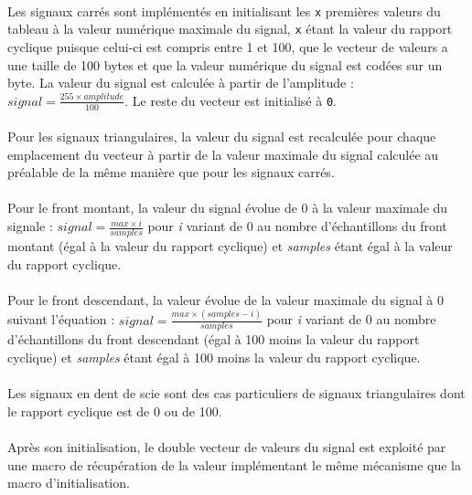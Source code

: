 \documentclass{article}
\begin{document}
    \paragraph{}
    Les signaux carrés sont implémentés en initialisant les \texttt{x} premières valeurs du tableau à la valeur numérique maximale du signal, \texttt{x} étant la valeur du rapport cyclique puisque celui-ci est compris entre 1 et 100, que le vecteur de valeurs a une taille de 100 bytes et que la valeur numérique du signal est codées sur un byte. La valeur du signal est calculée à partir de l'amplitude : $signal = \frac{255 \times amplitude}{100}$. Le reste du vecteur est initialisé à \texttt{0}.

    \paragraph{}
    Pour les signaux triangulaires, la valeur du signal est recalculée pour chaque emplacement du vecteur à partir de la valeur maximale du signal calculée au préalable de la même manière que pour les signaux carrés.

    \paragraph{}
    Pour le front montant, la valeur du signal évolue de 0 à la valeur maximale du signale : $signal = \frac{max \times i}{samples}$ pour \emph{i} variant de 0 au nombre d'échantillons du front montant (égal à la valeur du rapport cyclique) et \emph{samples} étant égal à la valeur du rapport cyclique.

    \paragraph{}
    Pour le front descendant, la valeur évolue de la valeur maximale du signal à 0 suivant l'équation : $signal = \frac{max \times (samples - i)}{samples}$ pour \emph{i} variant de 0 au nombre d'échantillons du front descendant (égal à 100 moins la valeur du rapport cyclique) et \emph{samples} étant égal à 100 moins la valeur du rapport cyclique.

    \paragraph{}
    Les signaux en dent de scie sont des cas particuliers de signaux triangulaires dont le rapport cyclique est de 0 ou de 100.

    \paragraph{}
    Après son initialisation, le double vecteur de valeurs du signal est exploité par une macro de récupération de la valeur implémentant le même mécanisme que la macro d'initialisation.
\end{document}
